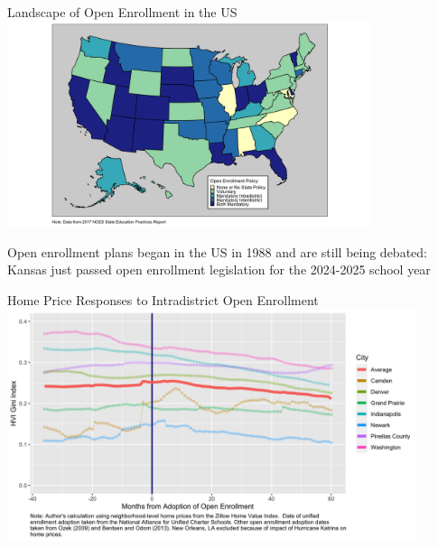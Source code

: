 \documentclass[notes,11pt, aspectratio=169]{beamer}
\newenvironment{wideitemize}{\itemize\addtolength{\itemsep}{10pt}}{\enditemize}
\begin{document}
\begin{frame}{Landscape of Open Enrollment in the US} 
\label{map}
\centering
\includegraphics[width=0.8\textwidth]{figures/policies_map.png}
  \begin{wideitemize}
    \item Open enrollment plans began in the US in 1988 and are still being debated: Kansas just passed open enrollment legislation for the 2024-2025 school year \hyperlink{mapback}
  \end{wideitemize}
\end{frame}

\begin{frame}{Home Price Responses to Intradistrict Open Enrollment}
\label{gini}
\centering
\includegraphics[width=0.9\textwidth]{figures/monthly_gini.png}
\hyperlink{giniback}{}
\end{frame}
\end{document}
